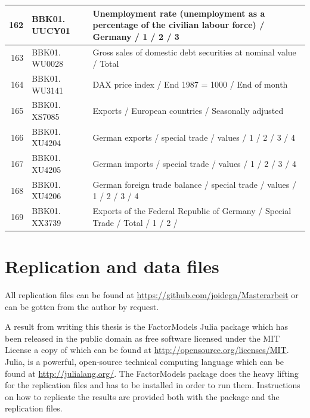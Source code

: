 \documentclass[12pt]{article}
\begin{document}
\begin{table}[ht]
\begin{tabular}{r|p{4cm}p{11cm}}
	\hline
	162 & BBK01. UUCY01 & Unemployment rate (unemployment as a percentage of the civilian labour force) / Germany / 1 / 2 / 3 \\ 
	\hline
	163 & BBK01. WU0028 & Gross sales of domestic debt securities at nominal value / Total \\ 
	\hline
	164 & BBK01. WU3141 & DAX price index / End 1987 = 1000 / End of month \\ 
	\hline
	165 & BBK01. XS7085 & Exports / European countries / Seasonally adjusted \\ 
	\hline
	166 & BBK01. XU4204 & German exports / special trade / values / 1 / 2 / 3 / 4 \\ 
	\hline
	167 & BBK01. XU4205 & German imports / special trade / values / 1 / 2 / 3 / 4 \\ 
	\hline
	168 & BBK01. XU4206 & German foreign trade balance / special trade / values / 1 / 2 / 3 / 4 \\ 
	\hline
	169 & BBK01. XX3739 & Exports of the Federal Republic of Germany / Special Trade / Total / 1 / 2 / \\ 
	\hline
    \hline
\end{tabular}
\end{table}


\clearpage
\newpage
\section{Replication and data files}
\label{replication and data files}
All replication files can be found at \url{https://github.com/joidegn/Masterarbeit} or can be gotten from the author by request.

A result from writing this thesis is the FactorModels Julia package which has been released in the public domain as free software licensed under the MIT License a copy of which can be found at \url{http://opensource.org/licenses/MIT}. Julia, is a powerful, open-source technical computing language which can be found at \url{http://julialang.org/}. The FactorModels package does the heavy lifting for the replication files and has to be installed in order to run them. Instructions on how to replicate the results are provided both with the package and the replication files.


\clearpage
\newpage



\clearpage
\newpage
{}
\restoregeometry
\thispagestyle{empty}
\singlespacing
\end{document}
